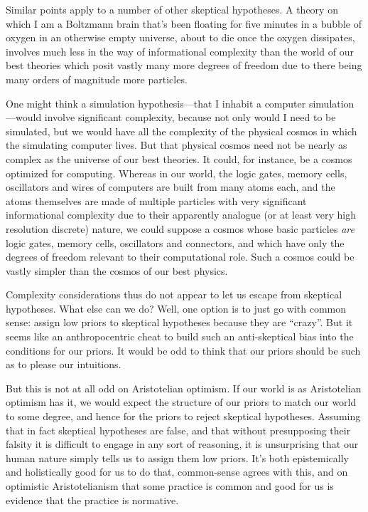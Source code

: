 Similar points apply to a number of other skeptical hypotheses. A theory on which I am a Boltzmann brain that's been 
floating for five minutes in a bubble of oxygen in an otherwise empty universe, about to die once the oxygen
dissipates, involves much less in the way of informational complexity than the world of our best theories which posit
vastly many more degrees of freedom due to there being many orders of magnitude more particles.

One might think a simulation hypothesis---that I inhabit a computer simulation---would involve significant complexity,
because not only would I need to be simulated, but we would have all the complexity of the physical cosmos in which the
simulating computer lives. But that physical cosmos need not be nearly as complex as the universe of our best theories.
It could, for instance, be a cosmos optimized for computing. Whereas in our world, the logic gates, memory cells, 
oscillators and wires of computers are built from many atoms each, and the atoms themselves
are made of multiple particles with very significant informational complexity due to their apparently analogue (or at least
very high resolution discrete) nature, we could suppose a cosmos whose basic particles \textit{are} logic gates, memory
cells, oscillators and connectors, and which have only the degrees of freedom relevant to their computational role. Such a 
cosmos could be vastly simpler than the cosmos of our best physics. 

Complexity considerations thus do not appear to let us escape from skeptical hypotheses. What else can we do? Well, one option is to just
go with common sense: assign low priors to skeptical hypotheses because they are ``crazy''.
But it seems like an anthropocentric cheat to 
build such an anti-skeptical bias into the conditions for our priors. It would be odd to think that our priors should
be such as to please our intuitions.

But this is not at all odd on Aristotelian optimism. If our world is as Aristotelian optimism has it, we would expect
the structure of our priors to match our world to some degree, and hence for the priors to reject skeptical hypotheses. Assuming
that in fact skeptical hypotheses are false, and that without presupposing their falsity it is difficult to engage
in any sort of reasoning, it is unsurprising that our human nature simply tells us to assign them low priors. 
It's both epistemically and holistically good for us to do that, common-sense agrees with this, and on optimistic Aristotelianism that some practice is common and good for us is evidence that the practice is normative.

